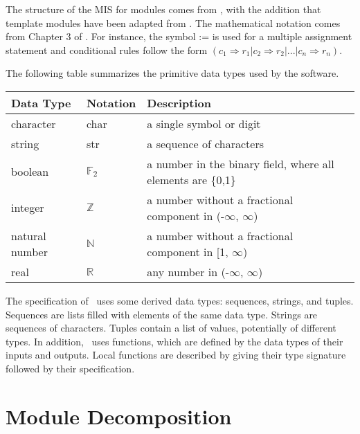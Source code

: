 \documentclass[12pt, titlepage]{article}
\begin{document}

The structure of the MIS for modules comes from \citet{HoffmanAndStrooper1995},
with the addition that template modules have been adapted from
\cite{GhezziEtAl2003}.  The mathematical notation comes from Chapter 3 of
\citet{HoffmanAndStrooper1995}.  For instance, the symbol := is used for a
multiple assignment statement and conditional rules follow the form $(c_1
\Rightarrow r_1 | c_2 \Rightarrow r_2 | ... | c_n \Rightarrow r_n )$.

The following table summarizes the primitive data types used by the \progname software. 

\begin{center}
\renewcommand{\arraystretch}{1.2}
\noindent 
\begin{tabular}{l l p{7.5cm}} 
\toprule 
\textbf{Data Type} & \textbf{Notation} & \textbf{Description}\\ 
\midrule
character & char & a single symbol or digit\\
string & str & a sequence of characters\\
boolean & $\mathbb{F}_{2}$ & a number in the binary field, where all elements are \{0,1\}\\
integer & $\mathbb{Z}$ & a number without a fractional component in (-$\infty$, $\infty$) \\
natural number & $\mathbb{N}$ & a number without a fractional component in [1, $\infty$) \\
real & $\mathbb{R}$ & any number in (-$\infty$, $\infty$)\\
\bottomrule
\end{tabular} 
\end{center}

\noindent
The specification of \progname \ uses some derived data types: sequences, strings, and
tuples. Sequences are lists filled with elements of the same data type. Strings
are sequences of characters. Tuples contain a list of values, potentially of
different types. In addition, \progname \ uses functions, which
are defined by the data types of their inputs and outputs. Local functions are
described by giving their type signature followed by their specification.

\section{Module Decomposition}
\end{document}
